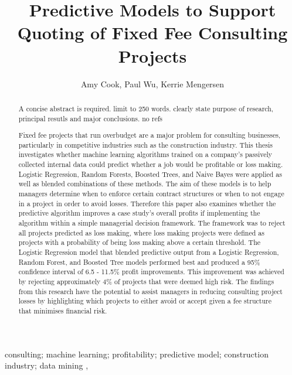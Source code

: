 \documentclass[]{elsarticle} %
\begin{document}
\begin{frontmatter}

  \title{Predictive Models to Support Quoting of Fixed Fee Consulting Projects}
    \author[Queensland University of Technology]{Amy Cook, Paul Wu, Kerrie Mengersen}
      \address[Queensland University of Technology]{School of Mathematical Sciences, George Street, Brisbane, QLD, 4000}
  
  \begin{abstract}
  A concise abstract is required. limit to 250 words. clearly state
  purpose of research, principal resutls and major conclusions. no refs
  
  Fixed fee projects that run overbudget are a major problem for
  consulting businesses, particularly in competitive industries such as
  the construction industry. This thesis investigates whether machine
  learning algorithms trained on a company's passively collected internal
  data could predict whether a job would be profitable or loss making.
  Logistic Regression, Random Forests, Boosted Trees, and Naive Bayes were
  applied as well as blended combinations of these methods. The aim of
  these models is to help managers determine when to enforce certain
  contract structures or when to not engage in a project in order to avoid
  losses. Therefore this paper also examines whether the predictive
  algorithm improves a case study's overall profits if implementing the
  algorithm within a simple managerial decision framework. The framework
  was to reject all projects predicted as loss making, where loss making
  projects were defined as projects with a probability of being loss
  making above a certain threshold. The Logistic Regression model that
  blended predictive output from a Logistic Regression, Random Forest, and
  Boosted Tree models performed best and produced a 95\% confidence
  interval of 6.5 - 11.5\% profit improvements. This improvement was
  achieved by rejecting approximately 4\% of projects that were deemed
  high risk. The findings from this research have the potential to assist
  managers in reducing consulting project losses by highlighting which
  projects to either avoid or accept given a fee structure that minimises
  financial risk.
  \end{abstract}
   \begin{keyword} consulting; machine learning; profitability; predictive model;
construction industry; data mining \sep \end{keyword}
 \end{frontmatter}
\end{document}
